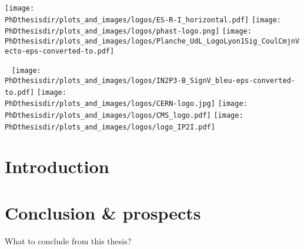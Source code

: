 \documentclass[10pt,aspectratio=169]{beamer}
\begin{document}
\begin{frame}[noframenumbering] \thispagestyle{empty}
\vspace{-.5cm}

\texttt{[image: \\PhDthesisdir/plots\_and\_images/logos/ES-R-I\_horizontal.pdf]}
\hfill
\texttt{[image: \\PhDthesisdir/plots\_and\_images/logos/phast-logo.png]}
\hfill
\texttt{[image: \\PhDthesisdir/plots\_and\_images/logos/Planche\_UdL\_LogoLyon1Sig\_CoulCmjnVecto-eps-converted-to.pdf]}

\vfill

\titlepage

\vfill

~ \hfill
\texttt{[image: \\PhDthesisdir/plots\_and\_images/logos/IN2P3-B\_SignV\_bleu-eps-converted-to.pdf]}
\hfill
\texttt{[image: \\PhDthesisdir/plots\_and\_images/logos/CERN-logo.jpg]}
\hfill
\texttt{[image: \\PhDthesisdir/plots\_and\_images/logos/CMS\_logo.pdf]}
\hfill
\texttt{[image: \\PhDthesisdir/plots\_and\_images/logos/logo\_IP2I.pdf]}
\hfill ~

\end{frame}

\subsection*{}
\section*{Introduction}





\subsection*{}
\section*{Conclusion \& prospects}
\begin{frame}
\begin{center}
\Large What to conclude from this thesis?
\end{center}
\end{frame}

\end{document}
